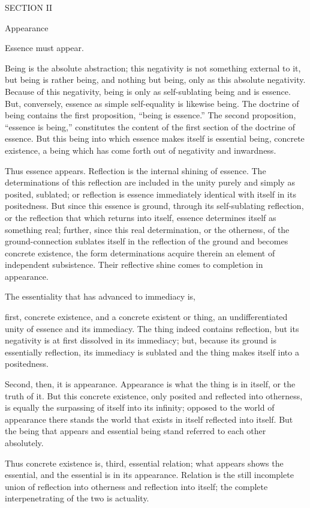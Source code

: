 SECTION II

Appearance

Essence must appear.

Being is the absolute abstraction;
this negativity is not something external to it,
but being is rather being,
and nothing but being,
only as this absolute negativity.
Because of this negativity,
being is only as self-sublating being
and is essence.
But, conversely,
essence as simple self-equality
is likewise being.
The doctrine of being contains
the first proposition, “being is essence.”
The second proposition, “essence is being,”
constitutes the content of the first section
of the doctrine of essence.
But this being into which
essence makes itself
is essential being,
concrete existence,
a being which has come forth
out of negativity and inwardness.

Thus essence appears.
Reflection is the internal shining of essence.
The determinations of this reflection are included
in the unity purely and simply as posited, sublated;
or reflection is essence immediately
identical with itself in its positedness.
But since this essence is ground,
through its self-sublating reflection,
or the reflection that which returns into itself,
essence determines itself as something real;
further, since this real determination,
or the otherness,
of the ground-connection sublates itself
in the reflection of the ground
and becomes concrete existence,
the form determinations acquire therein
an element of independent subsistence.
Their reflective shine comes to completion in appearance.

The essentiality that has advanced to immediacy is,

first, concrete existence,
and a concrete existent or thing,
an undifferentiated unity of
essence and its immediacy.
The thing indeed contains reflection,
but its negativity is at first
dissolved in its immediacy;
but, because its ground is
essentially reflection,
its immediacy is sublated
and the thing makes itself
into a positedness.

Second, then, it is appearance.
Appearance is what the thing is in itself,
or the truth of it.
But this concrete existence,
only posited and reflected into otherness,
is equally the surpassing of itself into its infinity;
opposed to the world of appearance
there stands the world that exists
in itself reflected into itself.
But the being that appears and essential being
stand referred to each other absolutely.

Thus concrete existence is, third, essential relation;
what appears shows the essential,
and the essential is in its appearance.
Relation is the still incomplete union of
reflection into otherness and reflection into itself;
the complete interpenetrating of the two is actuality.

